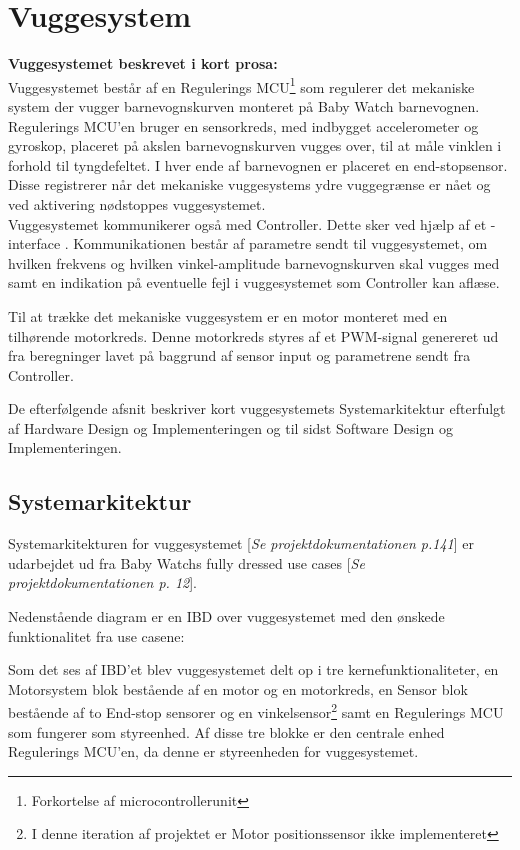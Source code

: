 \chapter{Vuggesystem}
\label{vuggesys}
\textbf{Vuggesystemet beskrevet i kort prosa:} \\
Vuggesystemet består af en Regulerings MCU\footnote{Forkortelse af microcontrollerunit} som regulerer det mekaniske system der vugger barnevognskurven monteret på Baby Watch barnevognen. \\ Regulerings MCU'en bruger en sensorkreds, med indbygget accelerometer og gyroskop, placeret på akslen barnevognskurven vugges over, til at måle vinklen i forhold til tyngdefeltet. I hver ende af barnevognen er placeret en end-stopsensor. Disse registrerer når det mekaniske vuggesystems ydre vuggegrænse er nået og ved aktivering nødstoppes vuggesystemet. \\ Vuggesystemet kommunikerer også med Controller. Dette sker ved hjælp af et \iic-interface \citep{I2C}. Kommunikationen består af parametre sendt til vuggesystemet, om hvilken frekvens og hvilken vinkel-amplitude barnevognskurven skal vugges med samt en indikation på eventuelle fejl i vuggesystemet som Controller kan aflæse.

Til at trække det mekaniske vuggesystem er en motor monteret med en tilhørende motorkreds. Denne motorkreds styres af et PWM-signal genereret ud fra beregninger lavet på baggrund af sensor input og parametrene sendt fra Controller.

De efterfølgende afsnit beskriver kort vuggesystemets Systemarkitektur efterfulgt af Hardware Design og Implementeringen og til sidst Software Design og Implementeringen.
\newpage
\section{Systemarkitektur}
\label{vs_sysark}
Systemarkitekturen for vuggesystemet [\textit{Se projektdokumentationen p.141}] er udarbejdet ud fra Baby Watchs fully dressed use cases [\textit{Se projektdokumentationen p. 12}].

Nedenstående diagram er en IBD over vuggesystemet med den ønskede funktionalitet fra use casene:


Som det ses af IBD'et blev vuggesystemet delt op i tre kernefunktionaliteter, en Motorsystem blok bestående af en motor og en motorkreds, en Sensor blok bestående af to End-stop sensorer og en vinkelsensor\footnote{I denne iteration af projektet er Motor positionssensor ikke implementeret} samt en Regulerings MCU som fungerer som styreenhed. Af disse tre blokke er den centrale enhed Regulerings MCU'en, da denne er styreenheden for vuggesystemet.

